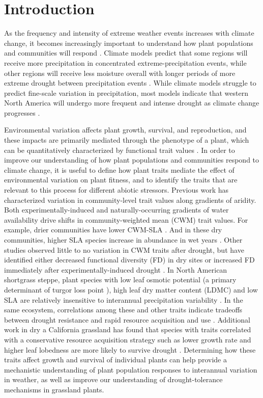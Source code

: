 \documentclass[12pt, letterpaper]{article}
\begin{document}
\section{Introduction}
As the frequency and intensity of extreme weather events increases with climate change, it becomes increasingly important to understand how plant populations and communities will respond . Climate models predict that some regions will receive more precipitation in concentrated extreme-precipitation events, while other regions will receive less moisture overall with longer periods of more extreme drought between precipitation events \cite{Knapp2008ConsequencesEcosystems}. While climate models struggle to predict fine-scale variation in precipitation, most models indicate that western North America will undergo more frequent and intense drought as climate change progresses \cite{Hartmann2013}.

Environmental variation affects plant growth, survival, and reproduction, and these impacts are primarily mediated through the phenotype of a plant, which can be quantitatively characterized by functional trait values . In order to improve our understanding of how plant populations and communities respond to climate change, it is useful to define how plant traits mediate the effect of environmental variation on plant fitness, and to identify the traits that are relevant to this process for different abiotic stressors. Previous work has characterized variation in community-level trait values along gradients of aridity. Both experimentally-induced and naturally-occurring gradients of water availability drive shifts in community-weighted mean (CWM) trait values. For example, drier communities have lower CWM-SLA \cite{Nunes2017WhichDrylands, Cornwell2009CommunityCalifornia}. And in these dry communities, higher SLA species increase in abundance in wet years \cite{Wilcox2020PlantPrairie}. Other studies observed little to no variation in CWM traits after drought, but have identified either decreased functional diversity (FD) in dry sites \cite{Luo2019LongGrasslands} or increased FD immediately after experimentally-induced drought \cite{GriffinNolan2019shifts}. In North American shortgrass steppe, plant species with low leaf osmotic potential (a primary determinant of turgor loss point \cite{Bartlett2012a}), high leaf dry matter content (LDMC) and low SLA are relatively insensitive to interannual precipitation variability \cite{Wilcox2020PlantPrairie}. In the same ecosystem, correlations among these and other traits indicate tradeoffs between drought resistance and rapid resource acquisition and use \cite{Blumenthal2020}. Additional work in dry a California grassland has found that species with traits correlated with a conservative resource acquisition strategy such as lower growth rate and higher leaf lobedness are more likely to survive drought \cite{Luong2021}. Determining how these traits affect growth and survival of individual plants can help provide a mechanistic understanding of plant population responses to interannual variation in weather, as well as improve our understanding of drought-tolerance mechanisms in grassland plants.
\end{document}
